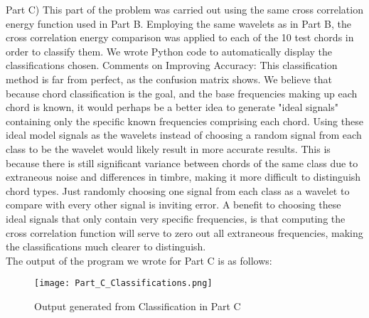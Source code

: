 \documentclass[letterpaper,twocolumn,10pt]{article}
\begin{document}
\vspace{1mm}
\linebreak

Part C) \hspace*{\fill}
\vspace{3mm}
\linebreak
This part of the problem was carried out using the same cross correlation energy function used in Part B. Employing the same wavelets as in Part B, the cross correlation energy comparison was applied to each of the 10 test chords in order to classify them. We wrote Python code to automatically display the classifications chosen. \hspace*{\fill}
\vspace{2mm}
\linebreak
Comments on Improving Accuracy: This classification method is far from perfect, as the confusion matrix shows. We believe that because chord classification is the goal, and the base frequencies making up each chord is known, it would perhaps be a better idea to generate "ideal signals" containing only the specific known frequencies comprising each chord. Using these ideal model signals as the wavelets instead of choosing a random signal from each class to be the wavelet would likely result in more accurate results. This is because there is still significant variance between chords of the same class due to extraneous noise and differences in timbre, making it more difficult to distinguish chord types. Just randomly choosing one signal from each class as a wavelet to compare with every other signal is inviting error. A benefit to choosing these ideal signals that only contain very specific frequencies, is that computing the cross correlation function will serve to zero out all extraneous frequencies, making the classifications much clearer to distinguish. \vspace{2mm}\\
The output of the program we wrote for Part C is as follows: \hspace*{\fill}
\vspace{5mm}
\linebreak
\begin{figure}[htb!]
\centering
\texttt{[image: Part\_C\_Classifications.png]}
\caption{Output generated from Classification in Part C\label{fig:Part_C_Classifications}}
\end{figure}
\linebreak
\end{document}
